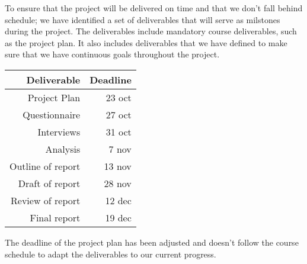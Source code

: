 \documentclass[ProjectPlan_innit.tex]{subfiles}
\begin{document}
To ensure that the project will be delivered on time and that we don't fall behind schedule; we have identified a set of deliverables that will serve as milstones during the project. The deliverables include mandatory course deliverables, such as the project plan. It also includes deliverables that we have defined to make sure that we have continuous goals throughout the project. 

\begin{table}[h]
	\centering
	\begin{tabular} { r | r }

		\textbf{Deliverable} 	& \textbf{Deadline} \\ \hline
		Project Plan 			& 23 oct \\ \hline
		Questionnaire 			& 27 oct \\ \hline
		Interviews				& 31 oct \\ \hline
		Analysis				& 7 nov \\ \hline
		Outline of report		& 13 nov \\ \hline
		Draft of report			& 28 nov \\ \hline
		Review of report		& 12 dec \\ \hline
		Final report 			& 19 dec \\ 


	\end{tabular}
\end{table}

The deadline of the project plan has been adjusted and doesn't follow the course schedule to adapt the deliverables to our current progress. 
\end{document}
